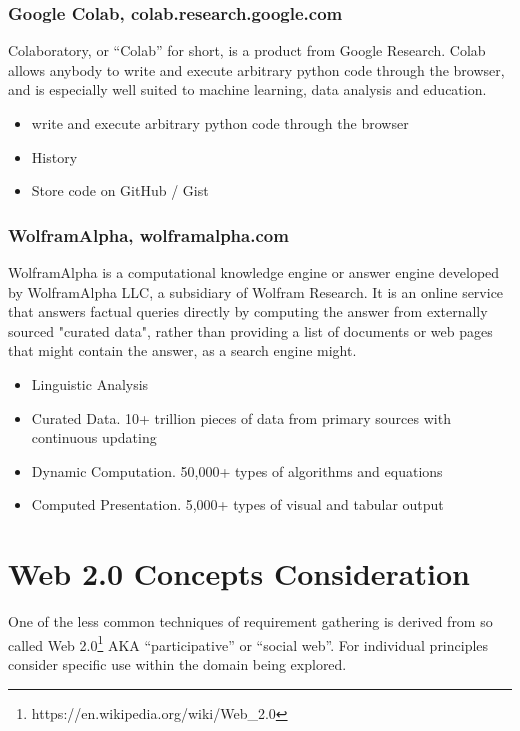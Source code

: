 \subsubsection{Google Colab, colab.research.google.com}

{Colaboratory, or ``Colab'' for short, is a product from Google Research. Colab allows anybody to write and execute arbitrary python code through the browser, and is especially well suited to machine learning, data analysis and education.}

\begin{itemize}
\item
  {write and execute arbitrary python code through the browser}
\item
  {History}
\item
  {Store code on GitHub / Gist}
\end{itemize}

\subsubsection{WolframAlpha, wolframalpha.com}

{WolframAlpha is a computational knowledge engine or answer engine developed by WolframAlpha LLC, a subsidiary of Wolfram Research. It is an online service that answers factual queries directly by computing the answer from externally sourced "curated data", rather than providing a list of documents or web pages that might contain the answer, as a search engine might.}

\begin{itemize}
\item
  {Linguistic Analysis}
\item
  {Curated Data. 10+ trillion pieces of data from primary sources with continuous updating}
\item
  {Dynamic Computation. 50,000+ types of algorithms and equations}
\item
  {Computed Presentation. 5,000+ types of visual and tabular output}
\end{itemize}

\section{Web 2.0 Concepts Consideration} \label{sec:web20}

{One of the less common techniques of requirement gathering is derived from so called Web 2.0\footnote{https://en.wikipedia.org/wiki/Web\_2.0} AKA ``participative'' or ``social web''. For individual principles consider specific use within the domain being explored.}

